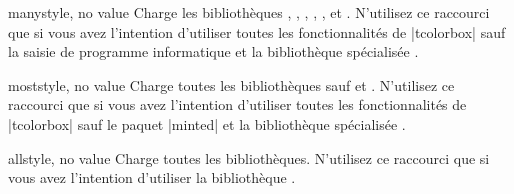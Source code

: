 {\begin{docTcbKey}[library]{many}{}{style, no value}
  Charge les bibliothèques , , , ,
  ,  et .
  N'utilisez ce raccourci que si vous avez l'intention
  d'utiliser toutes les fonctionnalités de |tcolorbox| sauf la saisie de programme
  informatique et la bibliothèque spécialisée .
\end{docTcbKey}


\begin{docTcbKey}[library]{most}{}{style, no value}
  Charge toutes les bibliothèques sauf  et .
  N'utilisez ce raccourci que si vous avez l'intention
  d'utiliser toutes les fonctionnalités de |tcolorbox|
  sauf le paquet |minted| et la bibliothèque spécialisée .
\end{docTcbKey}


\begin{docTcbKey}[library]{all}{}{style, no value}
  Charge toutes les bibliothèques. N'utilisez ce raccourci que si vous avez l'intention
  d'utiliser la bibliothèque .
\end{docTcbKey}


}
